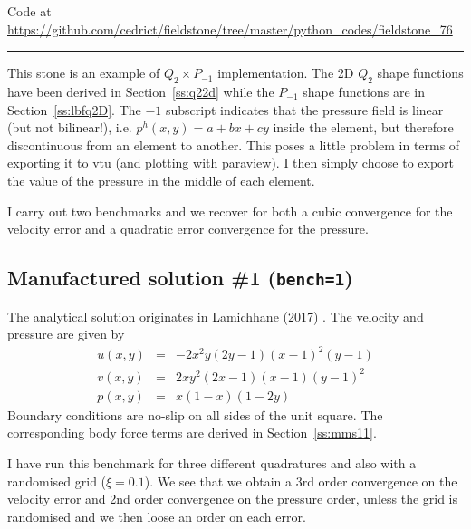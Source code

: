 

\begin{center}
Code at \url{https://github.com/cedrict/fieldstone/tree/master/python_codes/fieldstone_76}
\end{center}

\par\noindent\rule{\textwidth}{0.4pt}



This stone is an example of $Q_2\times P_{-1}$ implementation. 
The 2D $Q_2$ shape functions have been derived in Section~\ref{ss:q22d}
while the $P_{-1}$ shape functions are in Section~\ref{ss:lbfq2D}.
The $-1$ subscript indicates that the pressure field is linear (but not bilinear!), 
i.e. $p^h(x,y)=a+bx+cy$ inside the element, but therefore discontinuous 
from an element to another. 
This poses a little problem in terms of exporting it to vtu (and plotting with paraview).
I then simply choose to export the value of the pressure in the middle of 
each element. 

I carry out two benchmarks and we recover for both a cubic convergence 
for the velocity error and a quadratic error convergence for the pressure.

\subsection*{Manufactured solution \#1 ({\tt bench=1})}

The analytical solution originates in Lamichhane (2017) \cite{lami17}.
The velocity and pressure are given by
\begin{eqnarray}
u(x,y)&=&-2x^2y(2y-1)(x-1)^2(y-1) \\
v(x,y)&=& 2xy^2(2x-1)(x-1)(y-1)^2 \\
p(x,y)&=& x(1-x)(1-2y)
\end{eqnarray}
Boundary conditions are no-slip on all sides of the unit square. 
The corresponding body force terms are derived in Section~\ref{ss:mms11}. 

I have run this benchmark for three different quadratures and also with a 
randomised grid ($\xi=0.1$). We see that we obtain a 3rd order convergence 
on the velocity error and 2nd order convergence on the pressure order, 
unless the grid is randomised and we then loose an order on each error.

